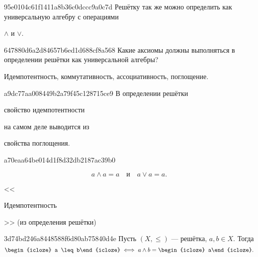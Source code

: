 \begin{note}{95e0104c61f1411a8b36c0dccc9a0c7d}
    Решётку так же можно определить как универсальную алгебру с операциями \begin{icloze}{1}\({ \land }\) и \({ \lor }\).\end{icloze}
\end{note}

\begin{note}{647880d6a2d84657b6ed1d688cf8a568}
    Какие аксиомы должны выполняться в определении решётки как универсальной алгебры?

    \begin{cloze}{1}
        Идемпотентность, коммутативность, ассоциативность, поглощение.
    \end{cloze}
\end{note}

\begin{note}{a9dc77aa008449b2a79f45c128715ce9}
    В определении решётки \begin{icloze}{1}свойство идемпотентности\end{icloze} на самом деле выводится из \begin{icloze}{2}свойства поглощения.\end{icloze}
\end{note}

\begin{note}{a70eaa64be014d1f8d32db2187ac39b0}
    \begin{icloze}{1}
        \[
            a \land a = a \quad \text{и} \quad a \lor a = a.
        \]
    \end{icloze}

    \begin{center}
        \tiny
        <<\begin{icloze}{2}Идемпотентность\end{icloze}>> (из определения решётки)
    \end{center}
\end{note}

\begin{note}{3d74bd246a8448588f6d80ab75840d4e}
    Пусть \({ (X, \leqslant) }\) --- решётка,\: \({ a, b \in X }\).
    Тогда
    \[
        \begin{icloze}{2}a \leq b\end{icloze} \iff a \land b = \begin{icloze}{1}a\end{icloze}.
    \]
\end{note}

